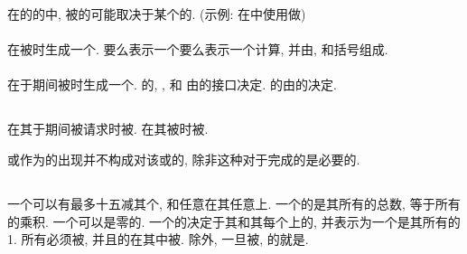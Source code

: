 在\Constant{}的\Subobject{}的\Object{}\Designator{}中, 被\Reference{}的\Portion{}可能取决于某个\Variable{}的\Value{}. (示例: 在\ArraySection{}中使用\IntegerType{}\Variable{}做\Index{})

\paragraph{\Expression{}}

\Expression{}在被\Evaluate{}时生成一个\Data{}\Entity{}. \Expression{}要么表示一个\Data{}\Object{}\Reference{}要么表示一个计算, 并由\Operand{}, \Operator{}和括号组成.

\paragraph{\Function{}\Reference{}}

\Function{}\Reference{}在\Function{}于\Expression{}\Evaluation{}期间被\Execute{}时生成一个\Data{}\Entity{}. \Function{}\Result{}的\Type{}, \TypeParameter{}, 和 \Rank{}由\Function{}的接口\Interface{}决定. \Function{}\Result{}的\Value{}由\Function{}的\Execution{}决定.

\subsection{\Reference{}}

\Data{}\Object{}在其\Value{}于\Execution{}期间被请求时被\Reference{}. \Procedure{}在其被\Execute{}时被\Reference{}.

\Data{}\Object{}\Designator{}或\Procedure{}\Designator{}作为\ActualArgument{}的出现并不构成对该\Data{}\Object{}或\Procedure{}的\Reference{}, 除非这种\Reference{}对于完成\ActualArgument{}的\Specification{}是必要的.

\subsection{\Array{}}

一个\Array{}可以有最多十五减其\Corank{}个\Dimension{}, 和任意\Extent{}在其任意\Dimension{}上. 一个\Array{}的\Size{}是其所有\Element{}的总数, 等于所有\Extent{}的乘积. 一个\Array{}可以是零\Size{}的. 一个\Array{}的\Shape{}决定于其\Rank{}和其每个\Dimension{}上的\Extent{}, 并表示为一个\Element{}是其所有\Extent{}的1\Rank{}\Array{}. 所有\Named{}\Array{}必须被\Declare{}, 并且\Named{}\Array{}的\Rank{}在其\Declaration{}中被\Specify{}. 除\AssumedRankArray{}外, 一旦被\Declare{}, \Named{}\Array{}的\Rank{}就是\Constant{}.

